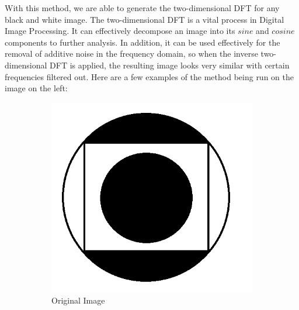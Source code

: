 \documentclass{amsproc}
\begin{document}
With this method, we are able to generate the two-dimensional DFT for any black and white image. The two-dimensional DFT  is a vital process in Digital Image Processing. It can effectively decompose an image into its $sine$ and $cosine$ components to further analysis. In addition, it can be used effectively for the removal of additive noise in the frequency domain, so when the inverse two-dimensional DFT is applied, the resulting image looks very similar with certain frequencies filtered out. Here are a few examples of the method being run on the image on the left:

\begin{figure}[h]
\centering
\begin{subfigure}{.4\textwidth}
	\centering
	\includegraphics[scale=.3]{images/dftraw1.png}
	\caption{Original Image}
	\label{fig:sub11}
\end{subfigure} \hspace{15mm}
\begin{subfigure}{.4\textwidth}
	\centering

\end{subfigure}
\end{figure}
\end{document}

